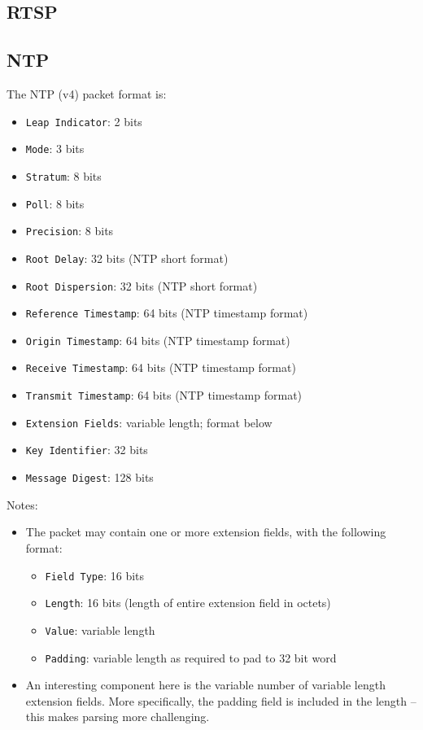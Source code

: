 \documentclass[10pt]{article}
\begin{document}
\subsection{RTSP}

\subsection{NTP}

The NTP (v4) packet format is:
\begin{itemize}
\item \texttt{Leap Indicator}: 2 bits
\item \texttt{Mode}: 3 bits
\item \texttt{Stratum}: 8 bits
\item \texttt{Poll}: 8 bits
\item \texttt{Precision}: 8 bits
\item \texttt{Root Delay}: 32 bits (NTP short format)
\item \texttt{Root Dispersion}: 32 bits (NTP short format)
\item \texttt{Reference Timestamp}: 64 bits (NTP timestamp format)
\item \texttt{Origin Timestamp}: 64 bits (NTP timestamp format)
\item \texttt{Receive Timestamp}: 64 bits (NTP timestamp format)
\item \texttt{Transmit Timestamp}: 64 bits (NTP timestamp format)
\item \texttt{Extension Fields}: variable length; format below
\item \texttt{Key Identifier}: 32 bits
\item \texttt{Message Digest}: 128 bits
\end{itemize}

Notes:
\begin{itemize}
\item The packet may contain one or more extension fields, with the following format:
\begin{itemize}
\item \texttt{Field Type}: 16 bits
\item \texttt{Length}: 16 bits (length of entire extension field in octets)
\item \texttt{Value}: variable length
\item \texttt{Padding}: variable length as required to pad to 32 bit word
\end{itemize}
\item An interesting component here is the variable number of variable length extension
fields. More specifically, the padding field is included in the length -- this makes
parsing more challenging.
\end{itemize}
\end{document}
